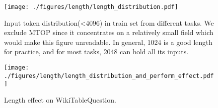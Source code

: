 \documentclass[11pt]{article}
\begin{document}
\begin{figure}[ht]
    \centering
	\texttt{[image: ./figures/length/length\_distribution.pdf]}
	\caption{Input token distribution(<4096) in train set from different tasks. We exclude MTOP since it concentrates on a relatively small field which would make this figure unreadable. In general, 1024 is a good length for practice, and for most tasks, 2048 can hold all its inputs. 
	}
	\label{fig:length-distribution}
\end{figure}

\begin{figure}[ht]
    \centering
	\texttt{[image: ./figures/length/length\_distribution\_and\_perform\_effect.pdf]}
	\caption{Length effect on WikiTableQuestion.
	}
	\label{fig:length-effect-wikitq}
\end{figure}
\end{document}
